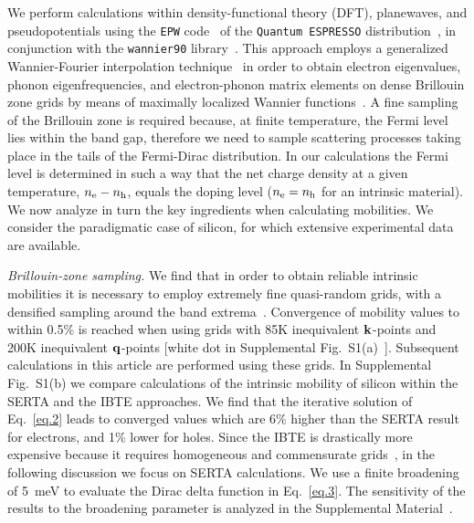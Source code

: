 \documentclass[aps,prl,twocolumn,superscriptaddress]{revtex4-1}
\begin{document}
We perform calculations within density-functional theory (DFT), planewaves, and pseudopotentials 
using the \texttt{EPW} code~\cite{Ponce2016a} of the \texttt{Quantum ESPRESSO}
distribution~\cite{Giannozzi2017}, in conjunction with the \texttt{wannier90} library~\cite{Mostofi2014}. 
This approach employs a generalized Wannier-Fourier interpolation technique~\cite{Giustino2007} 
in order to obtain electron eigenvalues, phonon eigenfrequencies, and electron-phonon
matrix elements on dense Brillouin zone grids by means of maximally localized Wannier functions~\cite{Marzari2012}.
A fine sampling of the Brillouin zone is required because, at finite temperature, 
the Fermi level lies within the band gap, therefore we need to sample scattering processes 
taking place in the tails of the Fermi-Dirac distribution. 
In our calculations the Fermi level is determined
in such a way that the net charge density at a given temperature, $n_{\rm e}-n_{\rm h}$, equals the 
doping level ($n_{\rm e}=n_{\rm h}$ for an intrinsic material). We now analyze in turn the key ingredients 
when calculating mobilities. We consider the paradigmatic case of silicon,
for which extensive experimental data are available.

{\it Brillouin-zone sampling.} 
We find that in order to obtain reliable intrinsic mobilities it is necessary to employ 
extremely fine quasi-random grids, with a densified sampling around the band extrema~\cite{SI}. 
Convergence of mobility values to within 0.5\% 
is reached when using grids with 85K inequivalent ${\bf k}$-points and 200K inequivalent ${\bf q}$-points 
[white dot in Supplemental Fig.~S1(a)~\cite{SI}]. Subsequent calculations in this article are performed using
these grids.
In Supplemental Fig.~S1(b) we compare calculations of the intrinsic mobility of silicon within the SERTA and the IBTE
approaches. We find that the iterative solution of Eq.~\eqref{eq.2} leads to converged values which
are 6\% higher than the SERTA result for electrons, and 1\% lower for holes. Since the IBTE is drastically
more expensive because it requires homogeneous and commensurate grids~\cite{Li2015,Fiorentini2016}, 
in the following discussion we focus on SERTA calculations.
We use a finite broadening of 5~meV to evaluate the Dirac delta function in Eq.~\eqref{eq.3}.
The sensitivity of the results to the broadening parameter is analyzed 
in the Supplemental Material~\cite{SI}.
\end{document}
